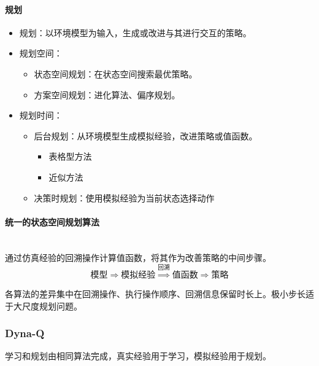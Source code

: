 \documentclass[
12pt, %
a4paper, 
oneside, %
headinclude,footinclude, %
]{scrartcl}
\begin{document}
\paragraph{规划}
\begin{itemize}
\item 规划：以环境模型为输入，生成或改进与其进行交互的策略。
\item 规划空间：
\begin{itemize}
\item 状态空间规划：在状态空间搜索最优策略。
\item 方案空间规划：进化算法、偏序规划。
\end{itemize}
\item 规划时间：
\begin{itemize}
\item 后台规划：从环境模型生成模拟经验，改进策略或值函数。
\begin{itemize}
\item 表格型方法
\item 近似方法
\end{itemize}
\item 决策时规划：使用模拟经验为当前状态选择动作
\end{itemize}
\end{itemize}
\paragraph{统一的状态空间规划算法}~\\

通过仿真经验的回溯操作计算值函数，将其作为改善策略的中间步骤。
$$ \text{模型} \Longrightarrow \text{模拟经验} \overset{\text{回溯}}{\Longrightarrow} \text{值函数} \Longrightarrow \text{策略} $$

各算法的差异集中在回溯操作、执行操作顺序、回溯信息保留时长上。极小步长适于大尺度规划问题。
\subsubsection[Dyna-Q]{Dyna-Q}
学习和规划由相同算法完成，真实经验用于学习，模拟经验用于规划。
\end{document}
